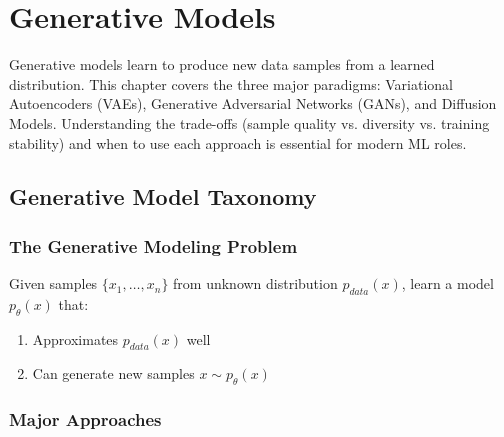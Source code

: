 \chapter{Generative Models}
\label{chap:generative_models}

\begin{tldr}
Generative models learn to produce new data samples from a learned distribution. This chapter covers the three major paradigms: Variational Autoencoders (VAEs), Generative Adversarial Networks (GANs), and Diffusion Models. Understanding the trade-offs (sample quality vs. diversity vs. training stability) and when to use each approach is essential for modern ML roles.
\end{tldr}

\section{Generative Model Taxonomy}
\label{sec:gen_taxonomy}

\subsection{The Generative Modeling Problem}

Given samples $\{x_1, \ldots, x_n\}$ from unknown distribution $p_{data}(x)$, learn a model $p_\theta(x)$ that:
\begin{enumerate}
    \item Approximates $p_{data}(x)$ well
    \item Can generate new samples $x \sim p_\theta(x)$
\end{enumerate}

\subsection{Major Approaches}

